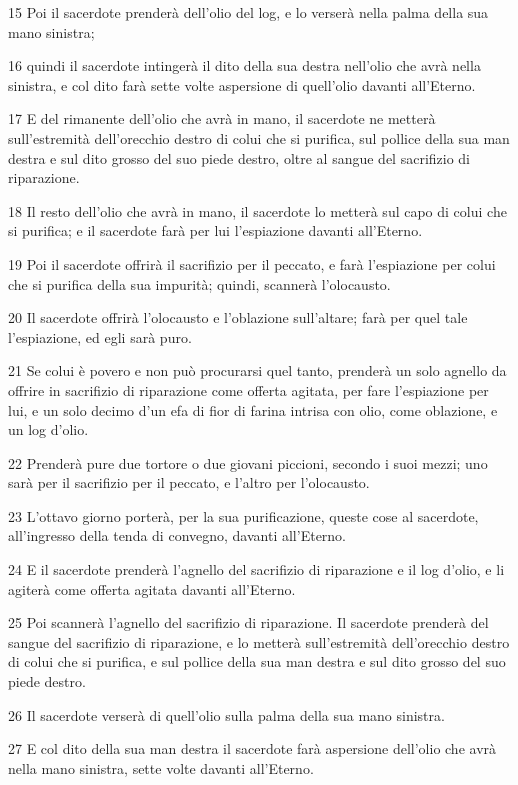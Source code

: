 \par 15 Poi il sacerdote prenderà dell'olio del log, e lo verserà nella palma della sua mano sinistra;
\par 16 quindi il sacerdote intingerà il dito della sua destra nell'olio che avrà nella sinistra, e col dito farà sette volte aspersione di quell'olio davanti all'Eterno.
\par 17 E del rimanente dell'olio che avrà in mano, il sacerdote ne metterà sull'estremità dell'orecchio destro di colui che si purifica, sul pollice della sua man destra e sul dito grosso del suo piede destro, oltre al sangue del sacrifizio di riparazione.
\par 18 Il resto dell'olio che avrà in mano, il sacerdote lo metterà sul capo di colui che si purifica; e il sacerdote farà per lui l'espiazione davanti all'Eterno.
\par 19 Poi il sacerdote offrirà il sacrifizio per il peccato, e farà l'espiazione per colui che si purifica della sua impurità; quindi, scannerà l'olocausto.
\par 20 Il sacerdote offrirà l'olocausto e l'oblazione sull'altare; farà per quel tale l'espiazione, ed egli sarà puro.
\par 21 Se colui è povero e non può procurarsi quel tanto, prenderà un solo agnello da offrire in sacrifizio di riparazione come offerta agitata, per fare l'espiazione per lui, e un solo decimo d'un efa di fior di farina intrisa con olio, come oblazione, e un log d'olio.
\par 22 Prenderà pure due tortore o due giovani piccioni, secondo i suoi mezzi; uno sarà per il sacrifizio per il peccato, e l'altro per l'olocausto.
\par 23 L'ottavo giorno porterà, per la sua purificazione, queste cose al sacerdote, all'ingresso della tenda di convegno, davanti all'Eterno.
\par 24 E il sacerdote prenderà l'agnello del sacrifizio di riparazione e il log d'olio, e li agiterà come offerta agitata davanti all'Eterno.
\par 25 Poi scannerà l'agnello del sacrifizio di riparazione. Il sacerdote prenderà del sangue del sacrifizio di riparazione, e lo metterà sull'estremità dell'orecchio destro di colui che si purifica, e sul pollice della sua man destra e sul dito grosso del suo piede destro.
\par 26 Il sacerdote verserà di quell'olio sulla palma della sua mano sinistra.
\par 27 E col dito della sua man destra il sacerdote farà aspersione dell'olio che avrà nella mano sinistra, sette volte davanti all'Eterno.
